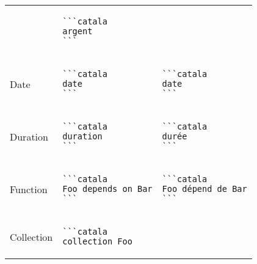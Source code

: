 \documentclass[a3paper,landscape]{article}
\begin{document}
\begin{multicols*}{2}
\begin{center}
\begin{tabular}{p{}p{}p{}}
\begin{verbatim}
\end{verbatim}
      \vspace*{-1.75em}
                       &
      \vspace*{-1.75em}
      \begin{verbatim}
```catala
argent
```
\end{verbatim}
      \vspace*{-1.75em}
      \\
      Date             &
      \vspace*{-1.75em}
      \begin{verbatim}
```catala
date
```
\end{verbatim}
      \vspace*{-1.75em}
                       &
      \vspace*{-1.75em}
      \begin{verbatim}
```catala
date
```
\end{verbatim}
      \vspace*{-1.75em}
      \\
      Duration         &
      \vspace*{-1.75em}
      \begin{verbatim}
```catala
duration
```
\end{verbatim}
      \vspace*{-1.75em}
                       &
      \vspace*{-1.75em}
      \begin{verbatim}
```catala
durée
```
\end{verbatim}
      \vspace*{-1.75em}
      \\
      Function         &
      \vspace*{-1.75em}
      \begin{verbatim}
```catala
Foo depends on Bar
```
\end{verbatim}
      \vspace*{-1.75em}
                       &
      \vspace*{-1.75em}
      \begin{verbatim}
```catala
Foo dépend de Bar
```
\end{verbatim}
      \vspace*{-1.75em}
      \\
      Collection       &
      \vspace*{-1.75em}
      \begin{verbatim}
```catala
collection Foo

\end{verbatim}
\end{tabular}
\end{center}
\end{multicols*}
\end{document}
